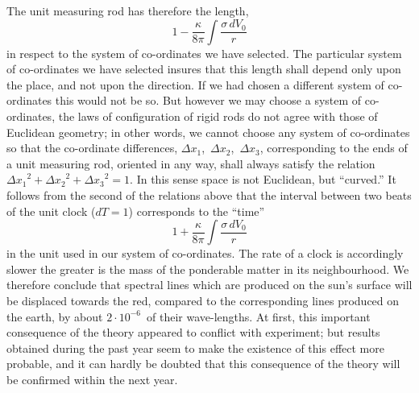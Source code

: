 \documentclass[12pt]{book}[2005/09/16]
\newcommand{\PageSep}[1]{\ignorespaces}
\begin{document}
The unit measuring rod has therefore the length,
\[
1 - \frac{\kappa}{8\pi} \int \frac{\sigma\, dV_{0}}{r}
\]
in respect to the system of co-ordinates we have selected.
The particular system of co-ordinates we have selected
\PageSep{101}
insures that this length shall depend only upon
the place, and not upon the direction. If we had
chosen a different system of co-ordinates this would not
be so. But however we may choose a system of co-ordinates,
the laws of configuration of rigid rods do not
agree with those of Euclidean geometry; in other words,
we cannot choose any system of co-ordinates so that the
co-ordinate differences, $\Delta x_{1}$,~$\Delta x_{2}$,~$\Delta x_{3}$, corresponding to the
ends of a unit measuring rod, oriented in any way, shall
always satisfy the relation ${\Delta x_{1}}^{2} + {\Delta x_{2}}^{2} + {\Delta x_{3}}^{2} = 1$. In
this sense space is not Euclidean, but ``curved.'' It
follows from the second of the relations above that the
interval between two beats of the unit clock ($dT = 1$)
corresponds to the ``time''
\[
1 + \frac{\kappa}{8\pi} \int \frac{\sigma\, dV_{0}}{r}
\]
in the unit used in our system of co-ordinates. The rate
of a clock is accordingly slower the greater is the mass of
the ponderable matter in its neighbourhood. We therefore
%
%
conclude that spectral lines which are produced on
the sun's surface will be displaced towards the red,
compared to the corresponding lines produced on the
earth, by about $2·10^{-6}$~of their wave-lengths. At first,
this important consequence of the theory appeared to
conflict with experiment; but results obtained during the
past year seem to make the existence of this effect more
probable, and it can hardly be doubted that this consequence
of the theory will be confirmed within the next
year.
\PageSep{102}
\end{document}
